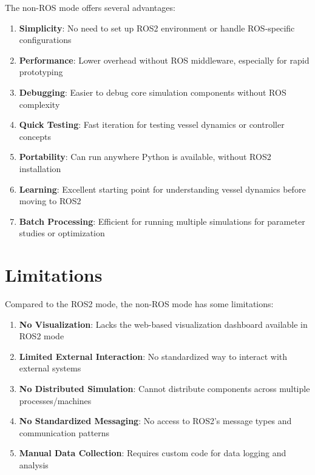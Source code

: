 \documentclass[
  letterpaper,
  DIV=11,
  numbers=noendperiod]{scrreprt}
\providecommand{\tightlist}{%
  \setlength{\itemsep}{0pt}\setlength{\parskip}{0pt}}\usepackage{longtable,booktabs,array}
\begin{document}

The non-ROS mode offers several advantages:

\begin{enumerate}
\def\labelenumi{\arabic{enumi}.}
\tightlist
\item
  \textbf{Simplicity}: No need to set up ROS2 environment or handle
  ROS-specific configurations
\item
  \textbf{Performance}: Lower overhead without ROS middleware,
  especially for rapid prototyping
\item
  \textbf{Debugging}: Easier to debug core simulation components without
  ROS complexity
\item
  \textbf{Quick Testing}: Fast iteration for testing vessel dynamics or
  controller concepts
\item
  \textbf{Portability}: Can run anywhere Python is available, without
  ROS2 installation
\item
  \textbf{Learning}: Excellent starting point for understanding vessel
  dynamics before moving to ROS2
\item
  \textbf{Batch Processing}: Efficient for running multiple simulations
  for parameter studies or optimization
\end{enumerate}

\section*{Limitations}\label{limitations}


Compared to the ROS2 mode, the non-ROS mode has some limitations:

\begin{enumerate}
\def\labelenumi{\arabic{enumi}.}
\tightlist
\item
  \textbf{No Visualization}: Lacks the web-based visualization dashboard
  available in ROS2 mode
\item
  \textbf{Limited External Interaction}: No standardized way to interact
  with external systems
\item
  \textbf{No Distributed Simulation}: Cannot distribute components
  across multiple processes/machines
\item
  \textbf{No Standardized Messaging}: No access to ROS2's message types
  and communication patterns
\item
  \textbf{Manual Data Collection}: Requires custom code for data logging
  and analysis
\end{enumerate}
\end{document}
